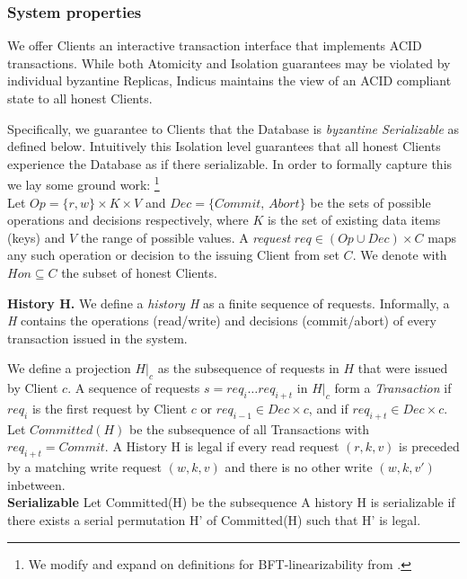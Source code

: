\subsubsection{System properties}
We offer Clients an interactive transaction interface that implements ACID transactions. While both Atomicity and Isolation guarantees may be violated by individual byzantine Replicas, Indicus maintains the view of an ACID compliant state to all honest Clients. 

Specifically, we guarantee to Clients that the Database is \textit{byzantine Serializable} as defined below. Intuitively this Isolation level guarantees that all honest Clients experience the Database as if there serializable. In order to formally capture this we lay some ground work: \footnote{We modify and expand on definitions for BFT-linearizability from \cite{liskov2006tolerating}. }\\

Let $Op =  \{r, w\} \times K \times V $ and $Dec = \{Commit, \,Abort\}$ be the sets of possible operations and decisions respectively, where $K$ is the set of existing data items (keys) and $V$ the range of possible values. A \textit{request} $req \in (Op \cup Dec) \times C$ maps any such operation or decision to the issuing Client from set $C$. We denote with $Hon \subseteq C$ the subset of honest Clients. 

\textbf{History H.} We define a \textit{history H} as a finite sequence of requests. Informally, a \textit{H} contains the operations (read/write) and decisions (commit/abort) of every transaction issued in the system.





We define a projection $H|_c$ as the subsequence of requests in $H$ that were issued by Client $c$. A sequence of requests $s = req_i \dots req_{i+t}$ in $H|_c$ form a \textit{Transaction} if $req_i$ is the first request by Client $c$ or $req_{i-1} \in Dec \times c$, and if $req_{i+t} \in Dec \times c$. Let $Committed(H)$ be the subsequence of all Transactions with $req_{i+t} = Commit$. A History H is legal if every read request $(r, k, v)$ is preceded by a matching write request $(w, k, v)$ and there is no other write $(w, k, v')$ inbetween.\\
\textbf{Serializable} Let Committed(H) be the subsequence 
A history H is serializable if there exists a serial permutation H' of Committed(H) such that H' is legal.

